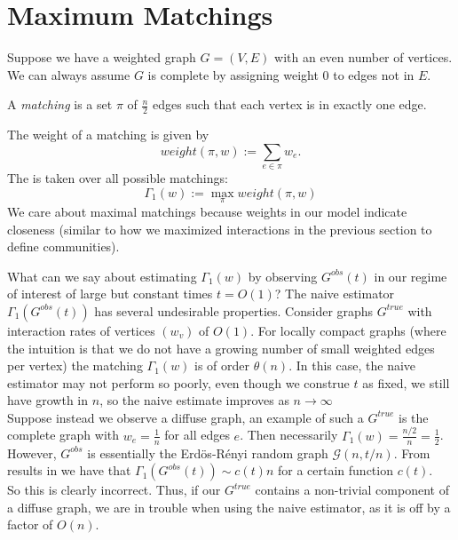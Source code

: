 
\chapter{Maximum Matchings}
Suppose we have a weighted graph $G = (V, E)$ with an even number of vertices.  We can always assume $G$ is complete by assigning weight $0$ to edges not in $E$.  

\begin{definition}
A \textit{matching} is a set $\pi$ of $\frac{n}{2}$ edges such that each vertex is in exactly one edge. 
\end{definition}

\begin{definition}
The weight of a matching is given by $$weight(\pi, w):= \sum_{e \in \pi} w_e .$$
The  is taken over all possible matchings: $$ \Gamma_1(w) := \max_{\pi} weight(\pi, w)$$ We care about maximal matchings because weights in our model indicate closeness (similar to how we maximized interactions in the previous section to define communities). 
\end{definition}
What can we say about estimating $\Gamma_1(w)$ by observing $G^{obs}(t)$ in our regime of interest of large but constant times $t = O(1)$? The naive estimator $\Gamma_1(G^{obs}(t))$ has several undesirable properties. Consider graphs $G^{true}$ with interaction rates of vertices $(w_v)$ of $O(1)$.  For locally compact graphs (where the intuition is that we do not have a growing number of small weighted edges per vertex) the matching $\Gamma_1(w)$ is of order $\theta(n)$.  In this case, the naive estimator may not perform so poorly, even though we construe $t$ as fixed, we still have growth in $n$, so the naive estimate improves as $n \rightarrow \infty$ \\

Suppose instead we observe a diffuse graph, an example of such a $G^{true}$ is the complete graph with $w_e = \frac{1}{n}$ for all edges $e$.  Then necessarily $\Gamma_1(w) = \frac{n/2}{n} = \frac{1}{2}$.  However, $G^{obs}$ is essentially the Erd\"os-R\'enyi random graph $\mathcal{G}(n, t/n)$. From results in \cite{David-incipientgiant} we have that $\Gamma_1(G^{obs}(t)) \sim c(t)n$ for a certain function $c(t)$.\\

So this is clearly incorrect.  Thus, if our $G^{true}$ contains a non-trivial component of a diffuse graph, we are in trouble when using the naive estimator, as it is off by a factor of $O(n)$.\\

